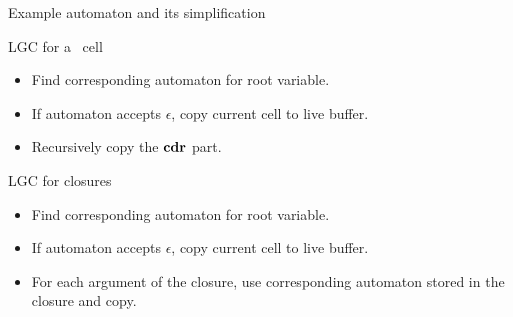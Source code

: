 \documentclass[xcolor=x11names,compress,mathserif]{beamer}
\renewcommand{\(}{\begin{columns}}
\renewcommand{\)}{\end{columns}}
\newcommand{\<}[1]{\begin{column}{#1}}
\renewcommand{\>}{\end{column}}
\begin{document}

\begin{frame}{Example automaton and its simplification}

\end{frame}

\begin{frame}{LGC for a \CONS\ cell}
      \begin{itemize}
      \item Find corresponding automaton for root variable.
      \item If automaton accepts $\epsilon$, copy current cell to live buffer.
      \item Recursively copy the $\mbox{$\mathbf{cdr}$}$ part.
      
      \end{itemize}
\end{frame}

\begin{frame}{LGC for closures}
      \begin{itemize}
      \item Find corresponding automaton for root variable.
      \item If automaton accepts $\epsilon$, copy current cell to live buffer.
      \item For each argument of the closure, use corresponding automaton stored in the closure and copy.
      
      \end{itemize}
\end{frame}

\end{document}
